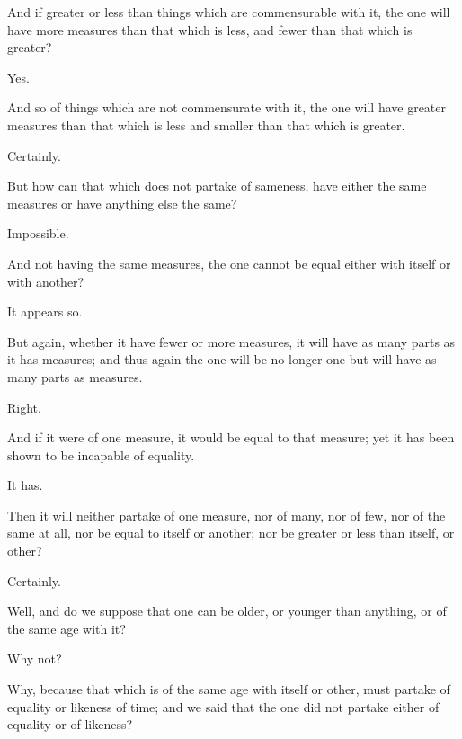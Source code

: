 \documentclass[11pt,letter]{article}
\begin{document}
\par  And if greater or less than things which are commensurable with it, the one will have more measures than that which is less, and fewer than that which is greater?

\par  Yes.

\par  And so of things which are not commensurate with it, the one will have greater measures than that which is less and smaller than that which is greater.

\par  Certainly.

\par  But how can that which does not partake of sameness, have either the same measures or have anything else the same?

\par  Impossible.

\par  And not having the same measures, the one cannot be equal either with itself or with another?

\par  It appears so.

\par  But again, whether it have fewer or more measures, it will have as many parts as it has measures; and thus again the one will be no longer one but will have as many parts as measures.

\par  Right.

\par  And if it were of one measure, it would be equal to that measure; yet it has been shown to be incapable of equality.

\par  It has.

\par  Then it will neither partake of one measure, nor of many, nor of few, nor of the same at all, nor be equal to itself or another; nor be greater or less than itself, or other?

\par  Certainly.

\par  Well, and do we suppose that one can be older, or younger than anything, or of the same age with it?

\par  Why not?

\par  Why, because that which is of the same age with itself or other, must partake of equality or likeness of time; and we said that the one did not partake either of equality or of likeness?
\end{document}
